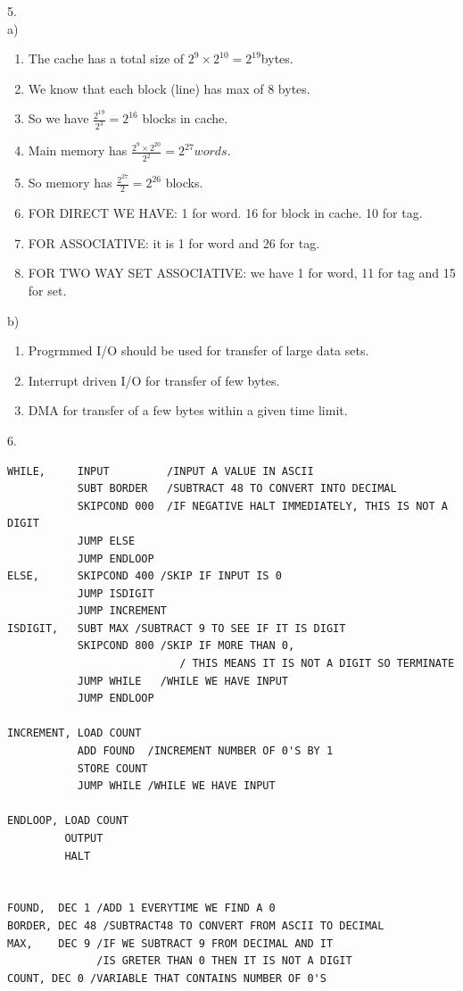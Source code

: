 \documentclass{article}
\begin{document}
5.\\
a)
\begin{enumerate}
	\item  The cache has a total size of $2^9 \times 2^{10} = 2^ {19}$bytes.
		\item We know that each block (line) has max of 8 bytes. 
		\item So we have $\frac{2^{19}}{2^3} = 2^{16}$ blocks in cache.
		\item Main memory has $\frac{2^9 \times 2^{20}}{2^2} = 
			2^{27}	words.$
		\item  So memory has $\frac{2^{27}}{2} = 2^{26}$ blocks.
		\item FOR DIRECT WE HAVE: 1 for word. 16 for block in cache. 10 for tag.
		\item FOR ASSOCIATIVE: it is 1 for word and 26 for tag.
		\item FOR TWO WAY SET ASSOCIATIVE: we have 1 for word, 11 for tag and 15 for set.
	\end{enumerate}
	b)\\
	\begin{enumerate}[i]
		\item Progrmmed I/O should be used for transfer of large data sets.
		\item Interrupt driven I/O for transfer of few bytes.
		\item DMA for transfer of a few bytes within a given time limit.
	\end{enumerate}
6.\\
\begin{verbatim}
WHILE,     INPUT         /INPUT A VALUE IN ASCII
           SUBT BORDER   /SUBTRACT 48 TO CONVERT INTO DECIMAL
           SKIPCOND 000  /IF NEGATIVE HALT IMMEDIATELY, THIS IS NOT A DIGIT
           JUMP ELSE
           JUMP ENDLOOP
ELSE,      SKIPCOND 400 /SKIP IF INPUT IS 0
           JUMP ISDIGIT
           JUMP INCREMENT
ISDIGIT,   SUBT MAX /SUBTRACT 9 TO SEE IF IT IS DIGIT
           SKIPCOND 800 /SKIP IF MORE THAN 0,
	                       / THIS MEANS IT IS NOT A DIGIT SO TERMINATE
           JUMP WHILE   /WHILE WE HAVE INPUT
           JUMP ENDLOOP

INCREMENT, LOAD COUNT
           ADD FOUND  /INCREMENT NUMBER OF 0'S BY 1
           STORE COUNT
           JUMP WHILE /WHILE WE HAVE INPUT

ENDLOOP, LOAD COUNT
         OUTPUT
         HALT


FOUND,  DEC 1 /ADD 1 EVERYTIME WE FIND A 0
BORDER, DEC 48 /SUBTRACT48 TO CONVERT FROM ASCII TO DECIMAL
MAX,    DEC 9 /IF WE SUBTRACT 9 FROM DECIMAL AND IT 
              /IS GRETER THAN 0 THEN IT IS NOT A DIGIT
COUNT, DEC 0 /VARIABLE THAT CONTAINS NUMBER OF 0'S
\end{verbatim}
\end{document}
